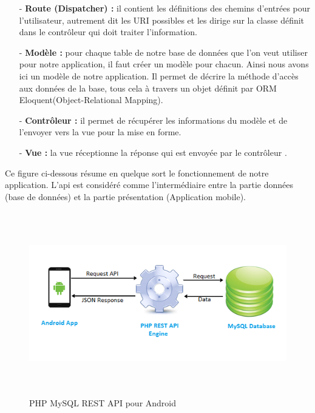 \begin{enumerate}
	\item [-] \textbf{Route (Dispatcher) : }il contient les définitions des chemins d’entrées pour l’utilisateur,
	autrement dit les URI possibles et les dirige sur la classe définit dans
	le contrôleur qui doit traiter l’information.
	\item [-] \textbf{ Modèle : }pour chaque table de notre base de données que l’on veut
	utiliser pour notre application, il faut créer un modèle pour chacun.
	Ainsi nous avons ici un modèle de notre application. Il permet de
	décrire la méthode d’accès aux données de la base, tous cela à
	travers un objet définit par ORM Eloquent(Object-Relational
	Mapping).
	\item [-] \textbf{Contrôleur : } il permet de récupérer les informations du modèle et de l’envoyer
	vers la vue pour la mise en forme.
	\item [-] \textbf{Vue : } la vue réceptionne la réponse qui est envoyée par le
	contrôleur .\newline
\end{enumerate}
Ce figure ci-dessous résume en quelque sort le fonctionnement de
notre application.
L’api est considéré comme l’intermédiaire entre la partie données
(base de données) et la partie présentation (Application mobile).
\begin{figure}[h!]
	\includegraphics[width=15cm, height=8cm]{./Template LaTeX/Images/php-mysql-rest-api-for-android.png}
	\caption{PHP MySQL REST API pour Android}
	\label{fig:birds}
\end{figure}
\newline \newline \newline



